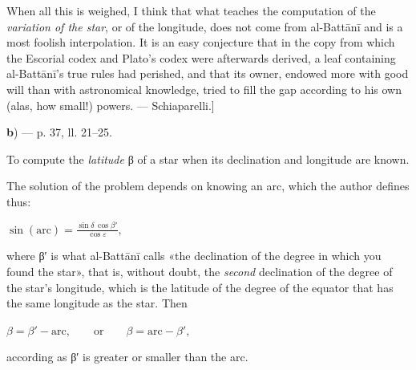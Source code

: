 \documentclass[11pt]{article}
\begin{document}
\par When all this is weighed, I think that what teaches the computation of the \emph{variation of the star}, or of the longitude, does not come from al-Battānī and is a most foolish interpolation. It is an easy conjecture that in the copy from which the Escorial codex and Plato's codex were afterwards derived, a leaf containing al-Battānī's true rules had perished, and that its owner, endowed more with good will than with astronomical knowledge, tried to fill the gap according to his own (alas, how small!) powers. — Schiaparelli.]\par
\par\begin{center}\textbf{b}) — p. 37, ll. 21–25.\end{center}
\par To compute the \emph{latitude} {\greekfont β} of a star when its declination and longitude are known.\par
\par The solution of the problem depends on knowing an arc, which the author defines thus: \par\noindent\hspace*{1.5em}$\displaystyle \sin(\text{arc}) = \frac{\sin\delta\,\cos\beta'}{\cos\varepsilon},$\par where {\greekfont β}′ is what al-Battānī calls «the declination of the degree in which you found the star», that is, without doubt, the \emph{second} declination of the degree of the star's longitude, which is the latitude of the degree of the equator that has the same longitude as the star. Then \par\noindent\hspace*{1.5em}$\displaystyle \beta = \beta' - \text{arc}, \qquad\text{or}\qquad \beta = \text{arc} - \beta',$\par according as {\greekfont β}′ is greater or smaller than the arc.\par
\begin{center}\end{center}
\end{document}
